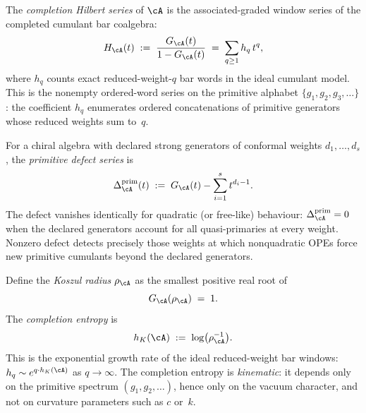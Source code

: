 \begin{definition}
\label{def:completion-hilbert-series}

The \emph{completion Hilbert series} of $\cA$ is the
associated-graded window series of the completed cumulant bar
coalgebra:
\begin{equation}
\label{eq:completion-hilbert-series}
H_\cA(t) \;:=\; \frac{G_\cA(t)}{1 - G_\cA(t)}
\;=\; \sum_{q \geq 1} h_q\, t^q,
\end{equation}
where $h_q$ counts exact reduced-weight-$q$ bar words in the ideal
cumulant model. This is the nonempty ordered-word series on the
primitive alphabet $\{g_1, g_2, g_3, \ldots\}$: the coefficient
$h_q$ enumerates ordered concatenations of primitive generators
whose reduced weights sum to~$q$.
\end{definition}

\begin{definition}
\label{def:primitive-defect-series}

For a chiral algebra with declared strong generators of conformal
weights $d_1, \ldots, d_s$, the \emph{primitive defect series} is
\begin{equation}
\label{eq:primitive-defect-series}
\Delta^{\mathrm{prim}}_\cA(t) \;:=\;
G_\cA(t) - \sum_{i=1}^s t^{d_i - 1}.
\end{equation}
The defect vanishes identically for quadratic (or free-like)
behaviour: $\Delta^{\mathrm{prim}}_\cA = 0$ when the
declared generators account for all quasi-primaries at every
weight. Nonzero defect detects precisely those weights at
which nonquadratic OPEs force new primitive cumulants beyond the
declared generators.
\end{definition}

\begin{definition}
\label{def:completion-entropy}

Define the \emph{Koszul radius} $\rho_\cA$ as the smallest positive
real root of
\begin{equation}
\label{eq:koszul-radius}
G_\cA(\rho_\cA) \;=\; 1.
\end{equation}
The \emph{completion entropy} is
\begin{equation}
\label{eq:completion-entropy}
h_K(\cA) \;:=\; \log\bigl(\rho_\cA^{-1}\bigr).
\end{equation}
This is the exponential growth rate of the ideal reduced-weight bar
windows: $h_q \sim e^{q \cdot h_K(\cA)}$ as $q \to \infty$. The
completion entropy is \emph{kinematic}: it depends only on the
primitive spectrum $(g_1, g_2, \ldots)$, hence only on the vacuum
character, and not on curvature parameters such as $c$ or~$k$.
\end{definition}

